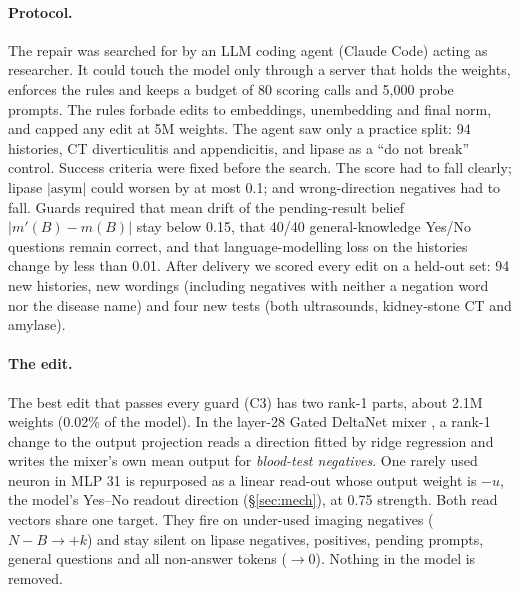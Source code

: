 \documentclass[10pt]{article}
\newcommand{\uhat}{\hat{u}}
\newcommand{\asym}{\mathrm{asym}}
\begin{document}
\paragraph{Protocol.} The repair was searched for by an LLM coding agent (Claude Code) acting as researcher. It could touch the model only through a server that holds the weights, enforces the rules and keeps a budget of 80 scoring calls and 5{,}000 probe prompts. The rules forbade edits to embeddings, unembedding and final norm, and capped any edit at 5M weights. The agent saw only a practice split: 94 histories, CT diverticulitis and appendicitis, and lipase as a ``do not break'' control. Success criteria were fixed before the search. The score had to fall clearly; lipase $|\asym|$ could worsen by at most 0.1; and wrong-direction negatives had to fall. Guards required that mean drift of the pending-result belief $|m'(B)-m(B)|$ stay below 0.15, that 40/40 general-knowledge Yes/No questions remain correct, and that language-modelling loss on the histories change by less than 0.01. After delivery we scored every edit on a held-out set: 94 new histories, new wordings (including negatives with neither a negation word nor the disease name) and four new tests (both ultrasounds, kidney-stone CT and amylase).

\paragraph{The edit.} The best edit that passes every guard (C3) has two rank-1 parts, about 2.1M weights (0.02\% of the model). In the layer-28 Gated DeltaNet mixer \citep{yang2025gateddelta}, a rank-1 change to the output projection reads a direction fitted by ridge regression and writes the mixer's own mean output for \emph{blood-test negatives}. One rarely used neuron in MLP 31 is repurposed as a linear read-out whose output weight is $-\uhat$, the model's Yes--No readout direction (\S\ref{sec:mech}), at 0.75 strength. Both read vectors share one target. They fire on under-used imaging negatives ($N{-}B \to +k$) and stay silent on lipase negatives, positives, pending prompts, general questions and all non-answer tokens ($\to 0$). Nothing in the model is removed.
\end{document}

